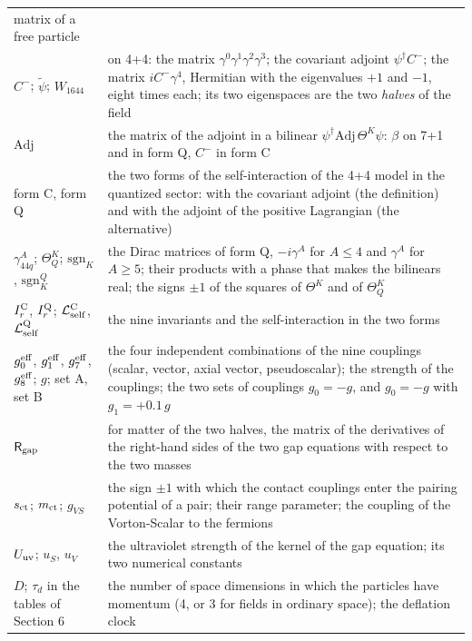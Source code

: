 \documentclass[
  10pt,
]{article}
\begin{document}
\begin{longtable}[]{@{}
  >{\raggedright\arraybackslash}p{}
  >{\raggedright\arraybackslash}p{}@{}}
matrix of a free particle \\
\(C^-\); \(\tilde\psi\); \(W_{1644}\) & on 4+4: the matrix
\(\gamma^0\gamma^1\gamma^2\gamma^3\); the covariant adjoint
\(\psi^\dagger C^-\); the matrix \(iC^-\gamma^4\), Hermitian with the
eigenvalues \(+1\) and \(-1\), eight times each; its two eigenspaces are
the two \emph{halves} of the field \\
\(\mathrm{Adj}\) & the matrix of the adjoint in a bilinear
\(\psi^\dagger\mathrm{Adj}\,\Theta^K\psi\): \(\beta\) on 7+1 and in form
Q, \(C^-\) in form C \\
form C, form Q & the two forms of the self-interaction of the 4+4 model
in the quantized sector: with the covariant adjoint (the definition) and
with the adjoint of the positive Lagrangian (the alternative) \\
\(\gamma_{44q}^A\); \(\Theta_Q^K\); \(\mathrm{sgn}_K\),
\(\mathrm{sgn}_K^Q\) & the Dirac matrices of form Q, \(-i\gamma^A\) for
\(A\le4\) and \(\gamma^A\) for \(A\ge5\); their products with a phase
that makes the bilinears real; the signs \(\pm1\) of the squares of
\(\Theta^K\) and of \(\Theta_Q^K\) \\
\(I_r^{\rm C}\), \(I_r^{\rm Q}\); \(\mathcal L_{\rm self}^{\rm C}\),
\(\mathcal L_{\rm self}^{\rm Q}\) & the nine invariants and the
self-interaction in the two forms \\
\(g_0^{\rm eff}\), \(g_1^{\rm eff}\), \(g_7^{\rm eff}\),
\(g_8^{\rm eff}\); \(g\); set A, set B & the four independent
combinations of the nine couplings (scalar, vector, axial vector,
pseudoscalar); the strength of the couplings; the two sets of couplings
\(g_0=-g\), and \(g_0=-g\) with \(g_1=+0.1\,g\) \\
\(\mathsf R_{\rm gap}\) & for matter of the two halves, the matrix of
the derivatives of the right-hand sides of the two gap equations with
respect to the two masses \\
\(s_{\rm ct}\); \(m_{\rm ct}\); \(g_{VS}\) & the sign \(\pm1\) with
which the contact couplings enter the pairing potential of a pair; their
range parameter; the coupling of the Vorton-Scalar to the fermions \\
\(U_{\rm uv}\); \(u_S\), \(u_V\) & the ultraviolet strength of the
kernel of the gap equation; its two numerical constants \\
\(D\); \(\tau_d\) in the tables of Section 6 & the number of space
dimensions in which the particles have momentum (4, or 3 for fields in
ordinary space); the deflation clock \\

\end{longtable}
\end{document}
